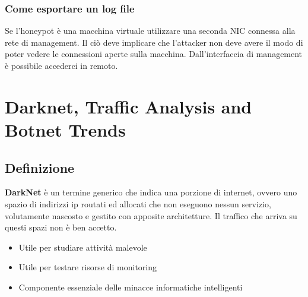 \documentclass{article}
\begin{document}
\subsubsection{Come esportare un log file}
Se l’honeypot è una macchina virtuale utilizzare una seconda NIC connessa alla rete di management. Il ciò deve implicare che l’attacker 
non deve avere il modo di poter vedere le connessioni aperte sulla macchina. Dall’interfaccia di management è possibile accederci in remoto.
\section{Darknet, Traffic Analysis and Botnet Trends}
\subsection{Definizione}
\textbf{DarkNet} è un termine generico che indica una porzione di internet, ovvero uno spazio di indirizzi ip routati ed allocati che non 
eseguono nessun servizio, volutamente nascosto e gestito con apposite architetture. Il traffico che arriva su questi spazi non è ben accetto.
\begin{itemize}
    \item Utile per studiare attività malevole
    \item Utile per testare risorse di monitoring
    \item Componente essenziale delle minacce informatiche intelligenti 
\end{itemize}
\end{document}
